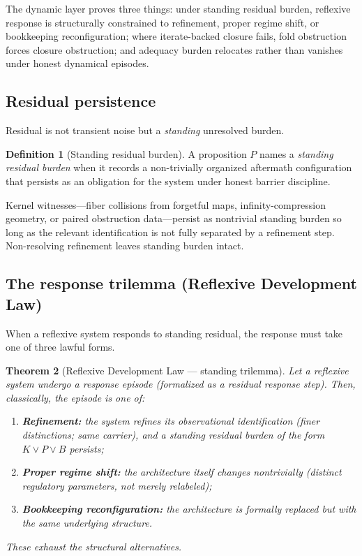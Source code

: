 \documentclass[11pt]{article}
\theoremstyle{plain}
\newtheorem{theorem}{Theorem}[section]
\theoremstyle{definition}
\newtheorem{definition}[theorem]{Definition}
\theoremstyle{remark}
\begin{document}
The dynamic layer proves three things: under standing residual burden, reflexive response is structurally constrained to refinement, proper regime shift, or bookkeeping reconfiguration; where iterate-backed closure fails, fold obstruction forces closure obstruction; and adequacy burden relocates rather than vanishes under honest dynamical episodes.

\subsection{Residual persistence}

Residual is not transient noise but a \emph{standing} unresolved burden.

\begin{definition}[Standing residual burden]
A proposition \(P\) names a \emph{standing residual burden} when it records a non-trivially organized aftermath configuration that persists as an obligation for the system under honest barrier discipline.
\end{definition}

\noindent Kernel witnesses---fiber collisions from forgetful maps, infinity-compression geometry, or paired obstruction data---persist as nontrivial standing burden so long as the relevant identification is not fully separated by a refinement step. Non-resolving refinement leaves standing burden intact.

\subsection{The response trilemma (Reflexive Development Law)}

When a reflexive system responds to standing residual, the response must take one of three lawful forms.

\begin{theorem}[Reflexive Development Law --- standing trilemma]\label{theorem:rdl-trilemma}
Let a reflexive system undergo a response episode (formalized as a \emph{residual response step}). Then, classically, the episode is one of:
\begin{enumerate}[label=(\roman*)]
\item \textbf{Refinement:} the system refines its observational identification (finer distinctions; same carrier), and a standing residual burden of the form \(K \lor P \lor B\) persists;
\item \textbf{Proper regime shift:} the architecture itself changes nontrivially (distinct regulatory parameters, not merely relabeled);
\item \textbf{Bookkeeping reconfiguration:} the architecture is formally replaced but with the same underlying structure.
\end{enumerate}
These exhaust the structural alternatives.
\end{theorem}
\end{document}
